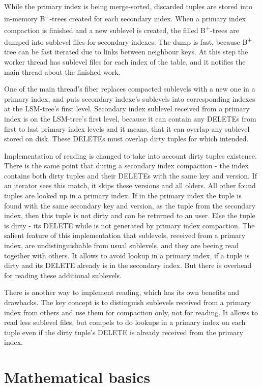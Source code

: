 \documentclass{vldb}
\begin{document}
While the primary index is being merge-sorted, discarded tuples are stored into
in-memory B\textsuperscript{+}-trees created for each secondary index. When a
primary index compaction is finished and a new sublevel is created, the filled
B\textsuperscript{+}-trees are dumped into sublevel files for secondary indexes.
The dump is fast, because B\textsuperscript{+}-tree can be fast iterated due to
links between neighbour keys. At this step the worker thread has sublevel files
for each index of the table, and it notifies the main thread about the finished
work.

One of the main thread's fiber replaces compacted sublevels with a new one in a
primary index, and puts secondary indexe's sublevels into corresponding indexes
at the LSM-tree's first level. Secondary index sublevel received from a primary
index is on the LSM-tree's first level, because it can contain any DELETEs from
first to last primary index levels and it means, that it can overlap any
sublevel stored on disk. These DELETEs must overlap dirty tuples for which
intended.

Implementation of reading is changed to take into account dirty tuples
existence. There is the same point that during a secondary index compaction -
the index contains both dirty tuples and their DELETEs with the same key and
version. If an iterator sees this match, it skips these versions and all olders.
All other found tuples are looked up in a primary index. If in the primary index
the tuple is found with the same secondary key and version, as the tuple from
the secondary index, then this tuple is not dirty and can be returned to an
user. Else the tuple is dirty - its DELETE while is not generated by primary
index compaction. The salient feature of this implementation that sublevels,
received from a primary index, are undistinguishable from usual sublevels, and
they are beeing read together with others. It allows to avoid lookup in a
primary index, if a tuple is dirty and its DELETE already is in the secondary
index. But there is overhead for reading these additional sublevels.

There is another way to implement reading, which has its own benefits and
drawbacks. The key concept is to distinguish sublevels received from a primary
index from others and use them for compaction only, not for reading. It allows
to read less sublevel files, but compels to do lookups in a primary index on
each tuple even if the dirty tuple's DELETE is already received from the primary
index.

\section{Mathematical basics}
\end{document}
